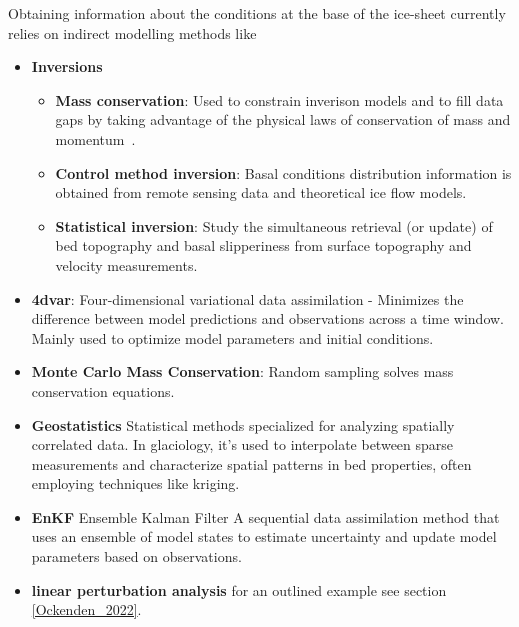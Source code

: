 Obtaining information about the conditions at the base of the ice-sheet currently relies on indirect modelling methods like
\begin{itemize}

    \item\textbf{Inversions}
        \begin{itemize}
            \item\textbf{Mass conservation}: Used to constrain inverison models and to fill data gaps by taking advantage of the physical laws of conservation of mass and momentum~\cite{Morlighem_2017, Morlighem_2020}. 
            \item\textbf{Control method inversion}: Basal conditions distribution information is obtained from remote sensing data and theoretical ice flow models\cite{deRydt_2013}.
            \item\textbf{Statistical inversion}: Study the simultaneous retrieval (or update) of bed topography and basal slipperiness from surface topography and velocity measurements\cite{deRydt_2013}.
        \end{itemize}

    \item\textbf{4dvar}: Four-dimensional variational data assimilation - Minimizes the difference between model predictions and observations across a time window. Mainly used to optimize model parameters and initial conditions\cite{Morlighem_Goldberg_2024}.

    \item\textbf{Monte Carlo Mass Conservation}: Random sampling solves mass conservation equations\cite{Brinkerhoff_2016}. 

    \item\textbf{Geostatistics} Statistical methods specialized for analyzing spatially correlated data. In glaciology, it's used to interpolate between sparse measurements and characterize spatial patterns in bed properties, often employing techniques like kriging\cite{Mackie_2020}.

    \item\textbf{EnKF} Ensemble Kalman Filter A sequential data assimilation method that uses an ensemble of model states to estimate uncertainty and update model parameters based on observations\cite{Morlighem_Goldberg_2024}.

    \item\textbf{linear perturbation analysis} for an outlined example see section \ref{Ockenden_2022}.
\end{itemize} 

